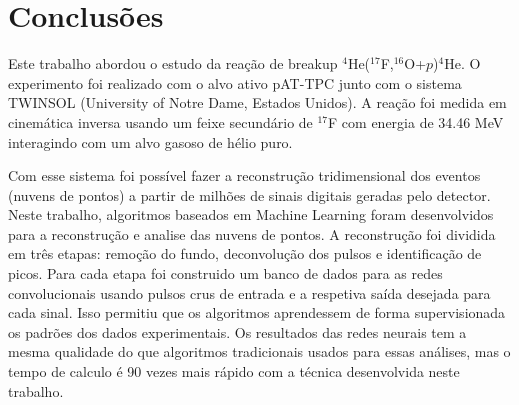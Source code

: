 \documentclass[a4paper,12pt,oneside]{book}
\begin{document}
%
%

\chapter{Conclusões}\label{chapter:conclusao}

\par Este trabalho abordou o estudo da reação de breakup $^4$He($^{17}$F,$^{16}$O+$p$)$^4$He. O experimento foi realizado com o alvo ativo pAT-TPC junto com o sistema TWINSOL (University of Notre Dame, Estados Unidos). A reação foi medida em cinemática inversa usando um feixe secundário de $^{17}$F com energia de 34.46 MeV interagindo com um alvo gasoso de hélio puro.

\par Com esse sistema foi possível fazer a reconstrução tridimensional dos eventos (nuvens de pontos) a partir de milhões de sinais digitais geradas pelo detector. Neste trabalho, algoritmos baseados em Machine Learning foram desenvolvidos para a reconstrução e analise das nuvens de pontos. A reconstrução foi dividida em três etapas: remoção do fundo, deconvolução dos pulsos e identificação de picos. Para cada etapa foi construido um banco de dados para as redes convolucionais usando pulsos crus de entrada e a respetiva saída desejada para cada sinal. Isso permitiu que os algoritmos aprendessem de forma supervisionada os padrões dos dados experimentais. Os resultados das redes neurais  tem a mesma qualidade do que algoritmos tradicionais usados para essas análises, mas o tempo de calculo é 90 vezes mais rápido com a técnica desenvolvida neste trabalho.
\end{document}
